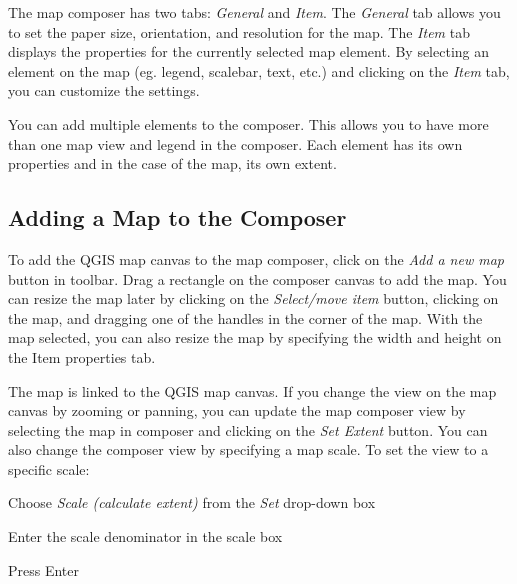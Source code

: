 The map composer has two tabs: \textit{General} and \textit{Item}. The
\textit{General} tab allows you to set the paper size, orientation, and
resolution for the map. The \textit{Item} tab displays the properties for the
currently selected map element. By selecting an element on the map (eg.
legend, scalebar, text, etc.) and clicking on the \textit{Item} tab, you can
customize the settings.

You can add multiple elements to the composer. This allows you to have more
than one map view and legend in the composer. Each element has its own
properties and in the case of the map, its own extent.
\subsection{Adding a Map to the Composer}
To add the QGIS map canvas to the map composer, click on the \textit{Add a new
map} button in toolbar. Drag a rectangle on the composer canvas to add the
map. You can resize the map later by clicking on the \textit{Select/move item}
button, clicking on the map, and dragging one of the handles in the corner of
the map. With the map selected, you can also resize the map by specifying the
width and height on the Item properties tab.

The map is linked to the QGIS map canvas. If you change the view on the map
canvas by zooming or panning, you can update the map composer view by
selecting the map in composer and clicking on the \textit{Set Extent} button.
You can also change the composer view by specifying a map scale. To set the
view to a specific scale:
\begin{compactenum}
\item Choose \textit{Scale (calculate extent)} from the \textit{Set} drop-down
box
\item Enter the scale denominator in the scale box
\item Press Enter
\end{compactenum} 
